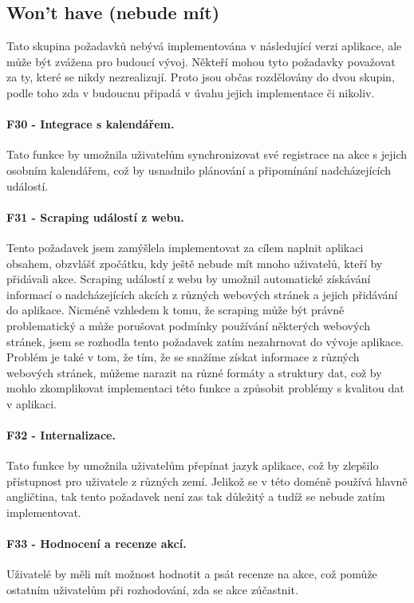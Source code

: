 \subsection{Won't have (nebude mít)}
Tato skupina požadavků nebývá implementována v následující verzi aplikace, ale může být zvážena pro budoucí vývoj. Někteří mohou tyto požadavky považovat za ty, které se nikdy nezrealizují. Proto jsou občas rozdělovány do dvou skupin, podle toho zda v budoucnu připadá v úvahu jejich implementace či nikoliv.\cite{moscow:definition}

\paragraph{F30 - Integrace s kalendářem.}\label{req:F30}
Tato funkce by umožnila uživatelům synchronizovat své registrace na akce s jejich osobním kalendářem, což by usnadnilo plánování a připomínání nadcházejících událostí.

\paragraph{F31 - Scraping událostí z webu.}\label{req:F31}
Tento požadavek jsem zamýšlela implementovat za cílem naplnit aplikaci obsahem, obzvlášť zpočátku, kdy ještě nebude mít mnoho uživatelů, kteří by přidávali akce. Scraping událostí z webu by umožnil automatické získávání informací o nadcházejících akcích z různých webových stránek a jejich přidávání do aplikace. Nicméně vzhledem k tomu, že scraping může být právně problematický a může porušovat podmínky používání některých webových stránek, jsem se rozhodla tento požadavek zatím nezahrnovat do vývoje aplikace. Problém je také v tom, že tím, že se snažíme získat informace z různých webových stránek, můžeme narazit na různé formáty a struktury dat, což by mohlo zkomplikovat implementaci této funkce a způsobit problémy s kvalitou dat v aplikaci.

\paragraph{F32 - Internalizace.}\label{req:F32}
Tato funkce by umožnila uživatelům přepínat jazyk aplikace, což by zlepšilo přístupnost pro uživatele z různých zemí. Jelikož se v této doméně používá hlavně angličtina, tak tento požadavek není zas tak důležitý a tudíž se nebude zatím implementovat.

\paragraph{F33 - Hodnocení a recenze akcí.}\label{req:F33}
Uživatelé by měli mít možnost hodnotit a psát recenze na akce,
což pomůže ostatním uživatelům při rozhodování, zda se akce zúčastnit.


